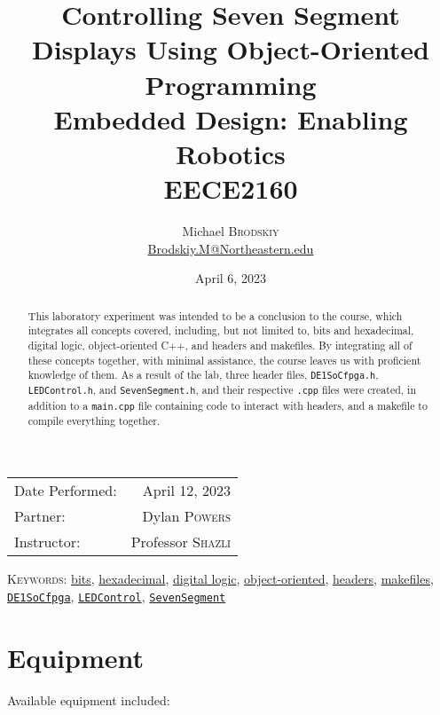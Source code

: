 \documentclass[
	letterpaper, %
	10pt, %
]{CSUniSchoolLabReport}
\title{Controlling Seven Segment Displays Using Object-Oriented Programming\\ Embedded Design: Enabling Robotics \\ EECE2160} %
\author{Michael \textsc{Brodskiy}\\ \small \href{mailto:Brodskiy.M@Northeastern.edu}{Brodskiy.M@Northeastern.edu}}
\date{April 6, 2023} %
\begin{document}
\maketitle %

\begin{center}
	\begin{tabular}{l r}
		Date Performed: & April 12, 2023 \\ %
        Partner: & Dylan \textsc{Powers} \\ %
		Instructor: & Professor \textsc{Shazli} %
	\end{tabular}
\end{center}

\newpage

\begin{abstract}

  This laboratory experiment was intended to be a conclusion to the course, which integrates all concepts covered, including, but not limited to, bits and hexadecimal, digital logic, object-oriented C++, and headers and makefiles. By integrating all of these concepts together, with minimal assistance, the course leaves us with proficient knowledge of them. As a result of the lab, three header files, \texttt{DE1SoCfpga.h}, \texttt{LEDControl.h}, and \texttt{SevenSegment.h}, and their respective \texttt{.cpp} files were created, in addition to a \texttt{main.cpp} file containing code to interact with headers, and a makefile to compile everything together.

\end{abstract}

\begin{flushleft}

  \textsc{Keywords:} \underline{bits}, \underline{hexadecimal}, \underline{digital logic}, \underline{object-oriented}, \underline{headers}, \underline{makefiles}, \underline{\texttt{DE1SoCfpga}}, \underline{\texttt{LEDControl}}, \underline{\texttt{SevenSegment}} 

\end{flushleft}

\newpage

\section{Equipment}

\hspace{.5 in} Available equipment included:\\
\end{document}
